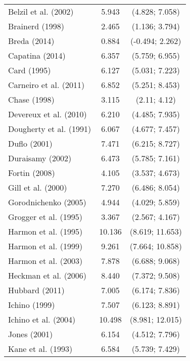 \begin{singlespace}
\begin{footnotesize}
\begin{longtable}{
@{\hskip\tabcolsep}
l
*{2}{c}
@{}}
                    Belzil et al. (2002) &  5.943 &   (4.828; 7.058) \\
                         Brainerd (1998) &  2.465 &   (1.136; 3.794) \\
                            Breda (2014) &  0.884 &  (-0.494; 2.262) \\
                         Capatina (2014) &  6.357 &   (5.759; 6.955) \\
                             Card (1995) &  6.127 &   (5.031; 7.223) \\
                  Carneiro et al. (2011) &  6.852 &   (5.251; 8.453) \\
                            Chase (1998) &  3.115 &     (2.11; 4.12) \\
                  Devereux et al. (2010) &  6.210 &   (4.485; 7.935) \\
                 Dougherty et al. (1991) &  6.067 &   (4.677; 7.457) \\
                            Duflo (2001) &  7.471 &   (6.215; 8.727) \\
                        Duraisamy (2002) &  6.473 &   (5.785; 7.161) \\
                           Fortin (2008) &  4.105 &   (3.537; 4.673) \\
                      Gill et al. (2000) &  7.270 &   (6.486; 8.054) \\
                    Gorodnichenko (2005) &  4.944 &   (4.029; 5.859) \\
                   Grogger et al. (1995) &  3.367 &   (2.567; 4.167) \\
                    Harmon et al. (1995) & 10.136 &  (8.619; 11.653) \\
                    Harmon et al. (1999) &  9.261 &  (7.664; 10.858) \\
                    Harmon et al. (2003) &  7.878 &   (6.688; 9.068) \\
                   Heckman et al. (2006) &  8.440 &   (7.372; 9.508) \\
                          Hubbard (2011) &  7.005 &   (6.174; 7.836) \\
                           Ichino (1999) &  7.507 &   (6.123; 8.891) \\
                    Ichino et al. (2004) & 10.498 &  (8.981; 12.015) \\
                            Jones (2001) &  6.154 &   (4.512; 7.796) \\
                      Kane et al. (1993) &  6.584 &   (5.739; 7.429) \\

\end{longtable}
\end{footnotesize}
\end{singlespace}
